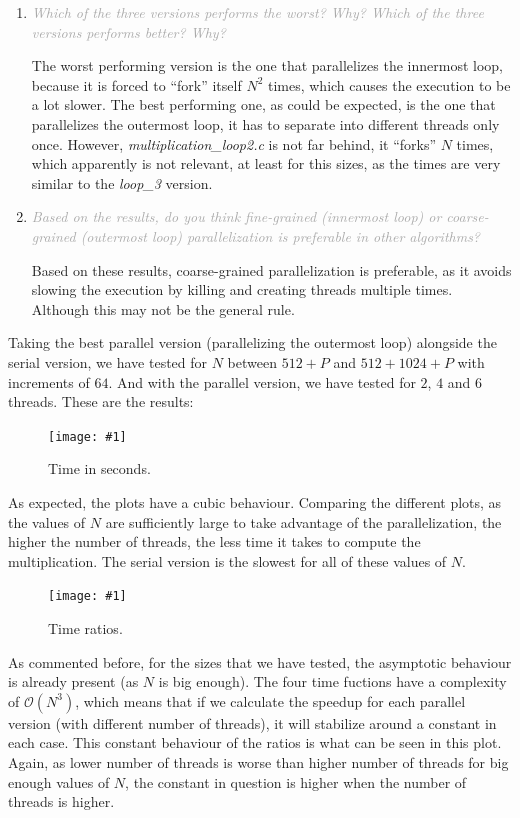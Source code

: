 \documentclass{article}
\newcommand{\myFigure}[4]{%
    \begin{figure}[!ht]
        \texttt{[image: \#1]}
        \centering
        \caption{#2}
        \label{#3}
    \end{figure}
}
\newcommand{\greyItem}[1]{\item\emph{\textcolor{darkgray}{#1}}}
\begin{document}
\begin{enumerate}[label=3.\arabic*,leftmargin=*]
\greyItem{ Which of the three versions performs the worst? Why? Which of the three versions performs better? Why?}

The worst performing version is the one that parallelizes the innermost loop, because it is forced to ``fork'' itself $N^2$ times, which causes the execution to be a lot slower. The best performing one, as could be expected, is the one that parallelizes the outermost loop, it has to separate into different threads only once. However, \emph{multiplication\_loop2.c} is not far behind, it ``forks'' $N$ times, which apparently is not relevant, at least for this sizes, as the times are very similar to the \emph{loop\_3} version.

\greyItem{Based on the results, do you think fine-grained (innermost loop) or coarse-grained (outermost loop) parallelization is preferable in other algorithms?}

Based on these results, coarse-grained parallelization is preferable, as it avoids slowing the execution by killing and creating threads multiple times. Although this may not be the general rule.

\end{enumerate}

Taking the best parallel version (parallelizing the outermost loop) alongside the serial version, we have tested for $N$ between $512+P$ and $512+1024+P$ with increments of $64$. And with the parallel version, we have tested for $2$, $4$ and $6$ threads. These are the results: 

\pagebreak

\myFigure{../material/outputs/out3/test_cl0/t_fig.png}{Time in seconds.}{times_e3}{0.65}

As expected, the plots have a cubic behaviour. Comparing the different plots, as the values of $N$ are sufficiently large to take advantage of the parallelization, the higher the number of threads, the less time it takes to compute the multiplication. The serial version is the slowest for all of these values of $N$.

\myFigure{../material/outputs/out3/test_cl0/r_fig.png}{Time ratios.}{ratios}{0.65}

As commented before, for the sizes that we have tested, the asymptotic behaviour is already present (as $N$ is big enough). The four time fuctions have a complexity of $\mathcal{O}(N^3)$, which means that if we calculate the speedup for each parallel version (with different number of threads), it will stabilize around a constant in each case. This constant behaviour of the ratios is what can be seen in this plot. Again, as lower number of threads is worse than higher number of threads for big enough values of $N$, the constant in question is higher when the number of threads is higher.
\end{document}
